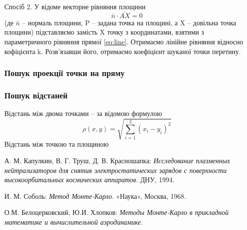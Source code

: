 \documentclass[a4paper,12pt]{article}
\begin{document}
Спосіб 2.
У відоме векторне рівняння площини
\begin{equation} \label{eq:plane-vector}
  \bar n \cdot \overline{AX} = 0
\end{equation}
(де $\bar n$ -- нормаль площини, P -- задана точка на площині, а X -- довільна точка площини) підставляємо замість X точку з координатами, взятими з параметричного рівняння прямої \ref{eq:line}. Отримаємо лінійне рівняння відносно кофіцієнта k. Розв’язавши його, отримаємо коефіцієнт шуканої точки перетину.

\subsubsection{Пошук проекції точки на пряму}



\subsubsection{Пошук відстаней}
Відстань між двома точками -- за відомою формулою
\begin{equation} \label{eq:distance}
  \rho(x,y) = \sqrt{\sum \limits_{i=1}^3 (x_i - y_i)^2}
\end{equation}
Відстань між точкою та площиною
\begin{thebibliography}{9}

  А. М. Капулкин, В. Г. Труш, Д. В. Красношапка:
  \emph{Исследование плазменных нейтрализаторов для снятия электростатических зарядов с поверхности высокоорбитальных космических аппаратов}.
  ДНУ, 1994.

  И. М. Соболь:
  \emph{Метод Монте-Карло}.
  «Наука», Москва, 1968.

  О.М. Белоцерковский, Ю.И. Хлопков:
  \emph{Методы Монте-Карло в прикладной математике и вычислительной аэродинамике}.

\end{thebibliography}
      
\end{document}

